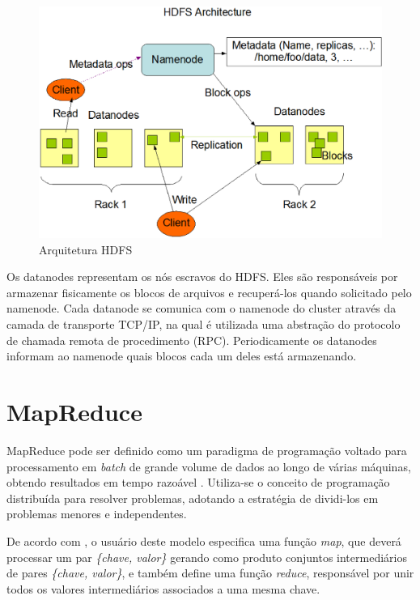 \begin{figure}[ht!]
	\centering
	\includegraphics[keepaspectratio=true,scale=0.45]
	  {figuras/hdfs-arquitetura.eps}
	\caption{Arquitetura HDFS}
	\label{fig-hdfs-arquitetura}
\end{figure}

Os datanodes representam os nós escravos do HDFS. Eles são responsáveis por armazenar  fisicamente os blocos de arquivos e recuperá-los quando solicitado pelo namenode. Cada datanode se comunica com o namenode do cluster através da camada de transporte TCP/IP, na qual é utilizada uma abstração do protocolo de chamada remota de procedimento (RPC). Periodicamente os datanodes informam ao namenode quais blocos cada um deles está armazenando.

\section{MapReduce}

MapReduce pode ser definido como um paradigma de programação voltado para processamento em \textit{batch} de grande volume de dados ao longo de várias máquinas, obtendo resultados em tempo razoável \cite{white2012}. Utiliza-se o conceito de programação distribuída para resolver problemas, adotando a estratégia de dividi-los em problemas menores e independentes.

De acordo com , o usuário deste modelo especifica uma função \textit{map}, que deverá processar um par \textit{\{chave, valor\}} gerando como produto conjuntos  intermediários de pares \textit{\{chave, valor\}}, e também define uma função \textit{reduce}, responsável por unir todos os valores intermediários associados a uma mesma chave.

